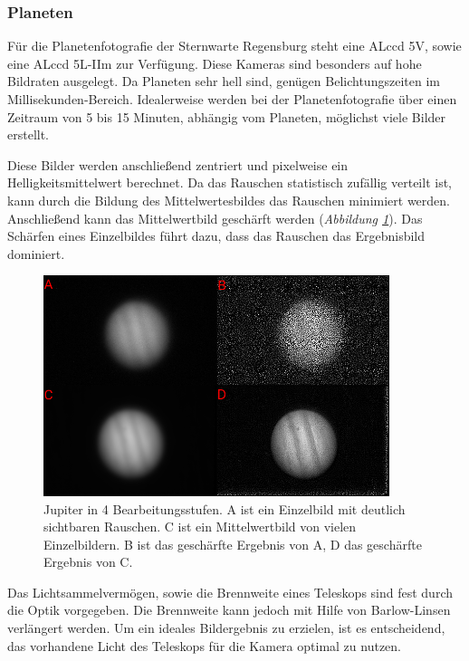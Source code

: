 \documentclass[10pt,a4paper,titlepage]{article}
\begin{document}
\subsubsection{Planeten}

Für die Planetenfotografie der Sternwarte Regensburg steht eine ALccd 5V, sowie eine ALccd 5L-IIm zur Verfügung. Diese Kameras sind besonders auf hohe Bildraten ausgelegt. Da Planeten sehr hell sind, genügen Belichtungszeiten im Millisekunden-Bereich. Idealerweise werden bei der Planetenfotografie über einen Zeitraum von 5 bis 15 Minuten, abhängig vom Planeten, möglichst viele Bilder erstellt.

Diese Bilder werden anschließend zentriert und pixelweise ein Helligkeitsmittelwert berechnet. Da das Rauschen statistisch zufällig verteilt ist, kann durch die Bildung des Mittelwertesbildes das Rauschen minimiert werden. Anschließend kann das Mittelwertbild geschärft werden (\textit{Abbildung \ref{fig:jupiter-bearbeitung}}). Das Schärfen eines Einzelbildes führt dazu, dass das Rauschen das Ergebnisbild dominiert.

\begin{figure}[h!]
  \centering
    \includegraphics[width=0.9\textwidth]{Jupiter_Bearbeitungsstufen}
  \caption{Jupiter in 4 Bearbeitungsstufen. A ist ein Einzelbild mit deutlich sichtbaren Rauschen. C ist ein Mittelwertbild von vielen Einzelbildern. B ist das geschärfte Ergebnis von A, D das geschärfte Ergebnis von C.}
  \label{fig:jupiter-bearbeitung}
\end{figure}

Das Lichtsammelvermögen, sowie die Brennweite eines Teleskops sind fest durch die Optik vorgegeben. Die Brennweite kann jedoch mit Hilfe von Barlow-Linsen verlängert werden. Um ein ideales Bildergebnis zu erzielen, ist es entscheidend, das vorhandene Licht des Teleskops für die Kamera optimal zu nutzen. 
\end{document}
